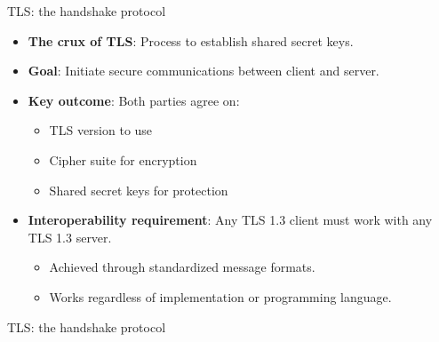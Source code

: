 \ifdefined\PRESENTATION\else\PassOptionsToClass{handout}{beamer}\fi\documentclass[aspectratio=169, lualatex]{beamer}
\begin{document}
\begin{frame}{TLS: the handshake protocol}
	\begin{itemize}
		\item \textbf{The crux of TLS}: Process to establish shared secret keys.
		\item \textbf{Goal}: Initiate secure communications between client and server.
		\item \textbf{Key outcome}: Both parties agree on:
		      \begin{itemize}
			      \item TLS version to use
			      \item Cipher suite for encryption
			      \item Shared secret keys for protection
		      \end{itemize}
		\item \textbf{Interoperability requirement}: Any TLS 1.3 client must work with any TLS 1.3 server.
		      \begin{itemize}
			      \item Achieved through standardized message formats.
			      \item Works regardless of implementation or programming language.
		      \end{itemize}
	\end{itemize}
\end{frame}

\begin{frame}{TLS: the handshake protocol}
\end{frame}
\end{document}
